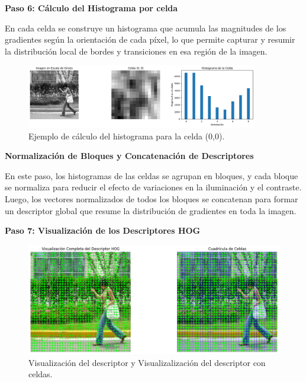 \documentclass[a4paper]{article}
\begin{document}
\textbf{Paso 6: Cálculo del Histograma por celda}
\par\vspace{0.5cm}

En cada celda se construye un histograma que acumula las magnitudes de los gradientes según la orientación de cada píxel, lo que permite capturar y resumir la distribución local de bordes y transiciones en esa región de la imagen.

\begin{figure}[H]
    \centering
    \includegraphics[width=0.9\textwidth]{images/hog_paso_6.png}
    \caption{Ejemplo de cálculo del histograma para la celda (0,0).}
\end{figure}

\textbf{Normalización de Bloques y Concatenación de Descriptores}
\par\vspace{0.5cm}

En este paso, los histogramas de las celdas se agrupan en bloques, y cada bloque se normaliza para reducir el efecto de variaciones en la iluminación y el contraste. Luego, los vectores normalizados de todos los bloques se concatenan para formar un descriptor global que resume la distribución de gradientes en toda la imagen.
\par\vspace{0.5cm}

\textbf{Paso 7: Visualización de los Descriptores HOG}
\par\vspace{0.5cm}

\begin{figure}[H]
    \centering
    \includegraphics[width=1.0\textwidth]{images/hog_paso_7.png}
    \caption{Visualización del descriptor y Visualizalización del descriptor con celdas.}
\end{figure}
\end{document}
